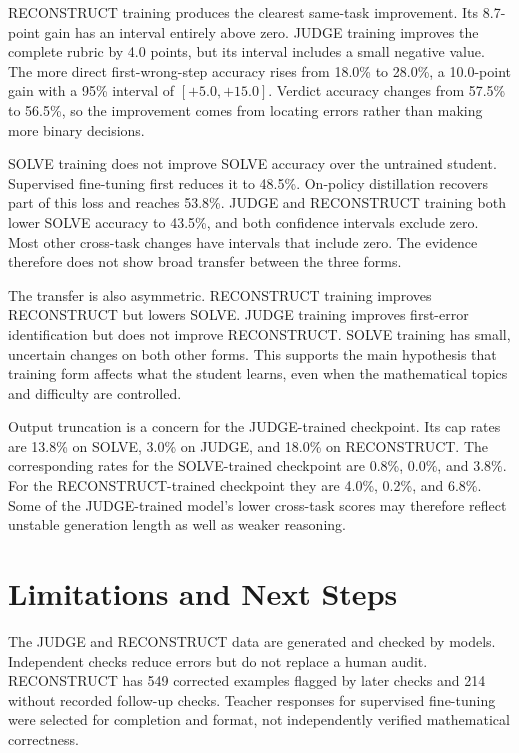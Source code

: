 \documentclass[11pt]{article}
\begin{document}
RECONSTRUCT training produces the clearest same-task improvement. Its 8.7-point gain has an interval entirely above zero. JUDGE training improves the complete rubric by 4.0 points, but its interval includes a small negative value. The more direct first-wrong-step accuracy rises from 18.0\% to 28.0\%, a 10.0-point gain with a 95\% interval of $[+5.0,+15.0]$. Verdict accuracy changes from 57.5\% to 56.5\%, so the improvement comes from locating errors rather than making more binary decisions.

SOLVE training does not improve SOLVE accuracy over the untrained student. Supervised fine-tuning first reduces it to 48.5\%. On-policy distillation recovers part of this loss and reaches 53.8\%. JUDGE and RECONSTRUCT training both lower SOLVE accuracy to 43.5\%, and both confidence intervals exclude zero. Most other cross-task changes have intervals that include zero. The evidence therefore does not show broad transfer between the three forms.

The transfer is also asymmetric. RECONSTRUCT training improves RECONSTRUCT but lowers SOLVE. JUDGE training improves first-error identification but does not improve RECONSTRUCT. SOLVE training has small, uncertain changes on both other forms. This supports the main hypothesis that training form affects what the student learns, even when the mathematical topics and difficulty are controlled.

Output truncation is a concern for the JUDGE-trained checkpoint. Its cap rates are 13.8\% on SOLVE, 3.0\% on JUDGE, and 18.0\% on RECONSTRUCT. The corresponding rates for the SOLVE-trained checkpoint are 0.8\%, 0.0\%, and 3.8\%. For the RECONSTRUCT-trained checkpoint they are 4.0\%, 0.2\%, and 6.8\%. Some of the JUDGE-trained model's lower cross-task scores may therefore reflect unstable generation length as well as weaker reasoning.

\section{Limitations and Next Steps}

The JUDGE and RECONSTRUCT data are generated and checked by models. Independent checks reduce errors but do not replace a human audit. RECONSTRUCT has 549 corrected examples flagged by later checks and 214 without recorded follow-up checks. Teacher responses for supervised fine-tuning were selected for completion and format, not independently verified mathematical correctness.
\end{document}

